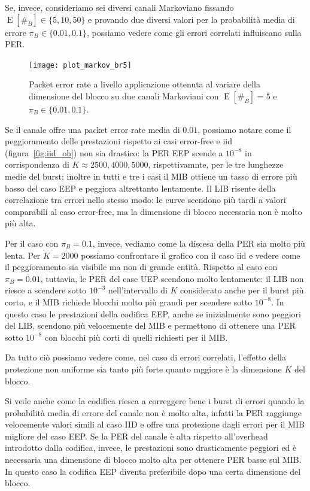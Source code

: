\documentclass[italian, a4paper, 12pt]{article}
\newcommand{\E}[1]{\operatorname{E}\left[#1\right]}
\newcommand{\EnB}{\E{\#_B}}
\begin{document}
Se, invece, consideriamo sei diversi canali Markoviano fissando $\EnB
\in \{5,10,50\}$ e provando due diversi valori per la probabilità
media di errore $\pi_B \in \{0.01, 0.1\}$, possiamo vedere come gli
errori correlati influiscano sulla PER.
%
\begin{figure}[htb]
  \centering
  \texttt{[image: plot\_markov\_br5]}
  \caption{Packet error rate a livello applicazione ottenuta al
    variare della dimensione del blocco su due canali Markoviani con
    $\EnB = 5$ e $\pi_B \in \{0.01, 0.1\}$.}
  \label{fig:markov_br5}
\end{figure}
%
Se il canale offre una packet error rate media di $0.01$, possiamo
notare come il peggioramento delle prestazioni rispetto ai casi
error-free e iid (figura~\ref{fig:iid_oh}) non sia drastico: la PER
EEP scende a $10^{-8}$ in corrispondenza di $K \approx 2500, 4000,
5000$, rispettivamnte, per le tre lunghezze medie del burst; inoltre
in tutti e tre i casi il MIB ottiene un tasso di errore più basso del
caso EEP e peggiora altrettanto lentamente. Il LIB risente della
correlazione tra errori nello stesso modo: le curve scendono più tardi
a valori comparabili al caso error-free, ma la dimensione di blocco
necessaria non è molto più alta.

Per il caso con $\pi_B = 0.1$, invece, vediamo come la discesa della
PER sia molto più lenta. Per $K = 2000$ possiamo confrontare il
grafico con il caso iid e vedere come il peggioramento sia visibile ma
non di grande entità. Rispetto al caso con $\pi_B = 0.01$, tuttavia,
le PER del case UEP scendono molto lentamente: il LIB non riesce a
scendere sotto $10^{-3}$ nell'intervallo di $K$ considerato anche per
il burst più corto, e il MIB richiede blocchi molto più grandi per
scendere sotto $10^{-8}$. In questo caso le prestazioni della codifica
EEP, anche se inizialmente sono peggiori del LIB, scendono più
velocemente del MIB e permettono di ottenere una PER sotto $10^{-8}$
con blocchi più corti di quelli richiesti per il MIB.

Da tutto ciò possiamo vedere come, nel caso di errori correlati,
l'effetto della protezione non uniforme sia tanto più forte quanto
mggiore è la dimensione $K$ del blocco.

Si vede anche come la codifica riesca a correggere bene i burst di
errori quando la probabilità media di errore del canale non è molto
alta, infatti la PER raggiunge velocemente valori simili al caso IID e
offre una protezione dagli errori per il MIB migliore del caso EEP.
%
Se la PER del canale è alta rispetto all'overhead introdotto dalla
codifica, invece, le prestazioni sono drasticamente peggiori ed è
necessaria una dimensione di blocco molto alta per ottenere PER basse
sul MIB. In questo caso la codifica EEP diventa preferibile dopo una
certa dimensione del blocco.
\end{document}

